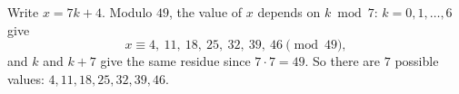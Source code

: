 Write $x=7k+4$. Modulo $49$, the value of $x$ depends on $k\bmod7$: $k=0,1,\dots,6$ give
\[x\equiv4,\ 11,\ 18,\ 25,\ 32,\ 39,\ 46\pmod{49},\]
and $k$ and $k+7$ give the same residue since $7\cdot7=49$. So there are $7$ possible values: $\boxed{4,11,18,25,32,39,46}$.

